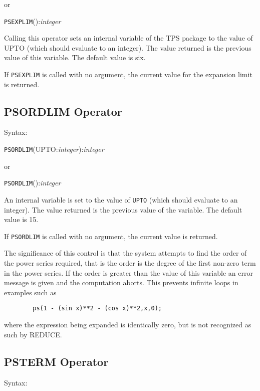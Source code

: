 \hspace*{4em} or

\hspace*{2em} {\tt PSEXPLIM}():{\em integer}

Calling this operator sets an internal variable of the
TPS package to the value of UPTO (which should evaluate to an integer).
The value returned is the previous value of this variable.
The default value is six.
 
If {\tt PSEXPLIM} is called with no argument, the current value for
the expansion limit is returned.
 

\subsection{PSORDLIM Operator}

Syntax:

\hspace*{2em} {\tt PSORDLIM}(UPTO:{\em integer}):{\em integer}

\hspace*{4em} or

\hspace*{2em} {\tt PSORDLIM}():{\em integer}

An internal variable is set to the value of {\tt UPTO} (which should
evaluate to an integer). The value returned is the previous value of
the variable.  The default value is 15.

If {\tt PSORDLIM} is called with no argument, the current value is
returned.

The significance of this control is that the system attempts to find
the order of the power series required, that is the order is the
degree of the first non-zero term in the power series.  If the order
is greater than the value of this variable an error message is given
and the computation aborts. This prevents infinite loops in examples
such as

\begin{verbatim}
        ps(1 - (sin x)**2 - (cos x)**2,x,0);
\end{verbatim}

where the expression being expanded is identically zero, but is not
recognized as such by REDUCE.


\subsection{PSTERM Operator}

Syntax:

